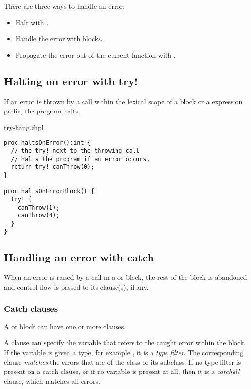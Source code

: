 There are three ways to handle an error:

\begin{itemize}
\item Halt with .
\item Handle the error with  blocks.
\item Propagate the error out of the current function with .
\end{itemize}


\subsection{Halting on error with try!}
\label{Halting_on_error_with_try_bang}

If an error is thrown by a call within the lexical scope of a 
block or a  expression prefix, the program halts.

\begin{chapelexample}{try-bang.chpl}
\begin{chapel}
\begin{verbatim}
proc haltsOnError():int {
  // the try! next to the throwing call
  // halts the program if an error occurs.
  return try! canThrow(0);
}

proc haltsOnErrorBlock() {
  try! {
    canThrow(1);
    canThrow(0);
  }
}
\end{verbatim}
\end{chapel}
\end{chapelexample}

\subsection{Handling an error with catch}
\label{Handling_an_error_with_catch}

When an error is raised by a call in a  or  block,
the rest of the block is abandoned and control flow is passed
to its  clause(s), if any.

\subsubsection{Catch clauses}
\label{Catch_clauses}

A  or  block can have one or more  clauses.

A  clause can specify the variable that refers to the caught
error within the  block. If the variable is given a type,
for example , it is a \emph{type filter}.
The corresponding  clause \emph{matches} the errors
that are of the class  or its subclass. If no type
filter is present on a catch clause, or if no variable is present at
all, then it is a \emph{catchall} clause, which matches all errors.

